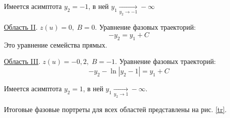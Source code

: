 	Имеется асимптота $y_2 = -1$, в ней $y_1\xrightarrow[y_2\to-1]{} -\infty$

	\underline{Область II}. $z(u) = 0,\;B=0$. Уравнение фазовых траекторий:
	\begin{equation*}
		-y_2 = y_1 + C
	\end{equation*}
	Это уравнение семейства прямых.
	
	\underline{Область III}. $z(u) = -0,2,\;B=-1$. Уравнение фазовых траекторий:
	\begin{equation*}
		-y_2 - \ln{|y_2-1|} = y_1 + C
	\end{equation*}

	Имеется асимптота $y_2 = 1$, в ней $y_1\xrightarrow[y_2\to1]{} -\infty$.
	
	Итоговые фазовые портреты для всех областей представлены на рис. \ref{tr}.

